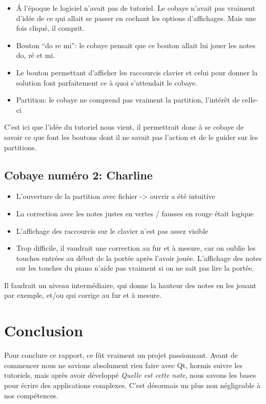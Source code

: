 \documentclass{article}
\begin{document}
\begin{itemize}
\item \'A l'époque le logiciel n'avait pas de tutoriel. Le cobaye n'avait pas vraiment d'idée de ce qui allait se passer en cochant les 
options d'affichages. Mais une fois cliqué, il comprit.
\item Bouton ``do re mi'': le cobaye pensait que ce bouton allait lui jouer les notes do, ré et mi.
\item Le bouton permettant d'afficher les raccourcis clavier et celui pour donner la solution font parfaitement ce à quoi s'attendait
le cobaye.
\item Partition: le cobaye ne comprend pas vraiment la partition, l'intérêt de celle-ci
\end{itemize}

C'est ici que l'idée du tutoriel nous vient, il permettrait donc à se cobaye de savoir ce que font les boutons dont il ne savait pas
l'action et de le guider sur les partitions.

\subsection{Cobaye numéro 2: Charline}

\begin{itemize}
\item L'ouverture de la partition avec fichier -> ouvrir a été intuitive
\item La correction avec les notes justes en vertes / fausses en rouge était logique
\item L'affichage des raccourcis sur le clavier n'est pas assez visible
\item Trop difficile, il vaudrait une correction au fur et à mesure, car on oublie les touches entrées au début de la portée après l'avoir jouée. L'affichage des notes sur les touches du piano n'aide pas vraiment si on ne sait pas lire la portée. 
\end{itemize}

Il faudrait un niveau intermédiaire, qui donne la hauteur des notes en les jouant par exemple, et/ou qui corrige au fur et à mesure.

\section{Conclusion}
Pour conclure ce rapport, ce fût vraiment un projet passionnant. Avant de commencer nous ne savions absolument rien faire avec Qt, hormis suivre les tutoriels, mais après avoir développé \emph{Quelle est cette note}, nous savons les bases pour écrire des applications complexes. C'est désormais un plus non négligeable à nos compétences. 
\end{document}
